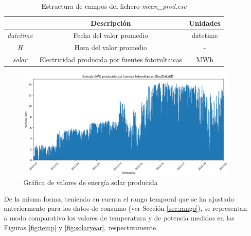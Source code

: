 \vspace{3mm}

\begin{table}[h!]
  \centering
  \begin{tabular}{|c|c|c|}
  \hline
  \rowcolor[HTML]{AAAAAA} 
  \multicolumn{1}{|c|}{\cellcolor[HTML]{AAAAAA}Campo} & \multicolumn{1}{c|}{\cellcolor[HTML]{AAAAAA}Descripción} & Unidades \\ \hline
  \textit{datetime} & Fecha del valor promedio & datetime \\ \hline
  \textit{H} & Hora del valor promedio & - \\ \hline
  \textit{solar} & Electricidad producida por fuentes fotovoltaicas & MWh \\ \hline
  \end{tabular}
  \caption{Estructura de campos del fichero \textit{mean\_prod.csv}}
  \label{tab:prodsamples}
\end{table}

\vspace{3mm}

\begin{figure}[h!]
  \centering
  \includegraphics[width=1\textwidth]{img/diseno/matplotsolar.png}
  \caption{Gráfica de valores de energía solar producida}
  \label{fig:solar}
\end{figure}

\vspace{3mm}

De la misma forma, teniendo en cuenta el rango temporal que se ha ajustado anteriormente para los datos de consumo (ver Sección \ref{sec:rango}), se representan a modo comparativo los valores de temperatura y de potencia medidos en las Figuras \ref{fig:temp} y \ref{fig:solaryear}, respectivamente. %

\vspace{3mm}

